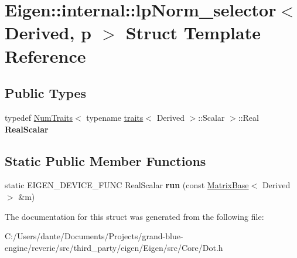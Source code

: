 \hypertarget{struct_eigen_1_1internal_1_1lp_norm__selector}{}\section{Eigen\+::internal\+::lp\+Norm\+\_\+selector$<$ Derived, p $>$ Struct Template Reference}
\label{struct_eigen_1_1internal_1_1lp_norm__selector}
\subsection*{Public Types}
\begin{DoxyCompactItemize}
\item 
\mbox{\label{struct_eigen_1_1internal_1_1lp_norm__selector_a81758e3978ec7c77154e3a7f2bc29eca}} 
typedef \mbox{\hyperlink{struct_eigen_1_1_num_traits}{Num\+Traits}}$<$ typename \mbox{\hyperlink{struct_eigen_1_1internal_1_1traits}{traits}}$<$ Derived $>$\+::Scalar $>$\+::Real {\bfseries Real\+Scalar}
\end{DoxyCompactItemize}
\subsection*{Static Public Member Functions}
\begin{DoxyCompactItemize}
\item 
\mbox{\label{struct_eigen_1_1internal_1_1lp_norm__selector_a0b5f864c870840d664e36fa33239aed8}} 
static E\+I\+G\+E\+N\+\_\+\+D\+E\+V\+I\+C\+E\+\_\+\+F\+U\+NC Real\+Scalar {\bfseries run} (const \mbox{\hyperlink{class_eigen_1_1_matrix_base}{Matrix\+Base}}$<$ Derived $>$ \&m)
\end{DoxyCompactItemize}


The documentation for this struct was generated from the following file\+:\begin{DoxyCompactItemize}
\item 
C\+:/\+Users/dante/\+Documents/\+Projects/grand-\/blue-\/engine/reverie/src/third\+\_\+party/eigen/\+Eigen/src/\+Core/Dot.\+h\end{DoxyCompactItemize}
